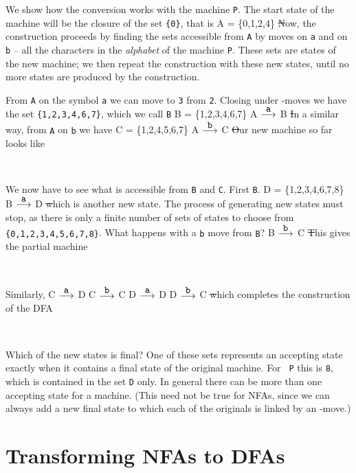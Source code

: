\documentclass[11pt]{article}
\begin{document}
We show how the conversion works with the machine {\tt P}. The start state of
the machine will be the closure of the set {\tt \{0\}}, that is 
\so
A = \{0,1,2,4\}
\st
Now, the construction proceeds by finding the sets accessible from {\tt A} by
moves on {\tt a} and on {\tt b} -- all the characters in the {\em alphabet\/}
of the machine {\tt P}. These sets are states of the new machine; we then
repeat the construction with these new states, until no more states are
produced by the construction.

From {\tt A} on the symbol {\tt a} we can move to {\tt 3} from {\tt 2}.
Closing  under \eps-moves we have the set {\tt \{1,2,3,4,6,7\}}, which we call
{\tt B}
\so
B = \{1,2,3,4,6,7\}
A $\stackrel{\mbox{\tt a}}{\longrightarrow}$ B
\st
In a similar way, from {\tt A} on {\tt b} we have 
\so
C = \{1,2,4,5,6,7\}
A $\stackrel{\mbox{\tt b}}{\longrightarrow}$ C
\st
Our new machine so far looks like       

\noindent
\begin{center}\  \end{center}

We now have to see what is accessible from {\tt B} and {\tt C}. First {\tt B}.
\so
D = \{1,2,3,4,6,7,8\}
B $\stackrel{\mbox{\tt a}}{\longrightarrow}$ D
\st
which is another new state. The process of generating new states must stop, as
there is only a finite number of sets of states to choose from
{\tt \{0,1,2,3,4,5,6,7,8\}}. What happens with a {\tt b} move from {\tt B}?
\so
B $\stackrel{\mbox{\tt b}}{\longrightarrow}$ C
\st
This gives the partial machine
\noindent
\begin{center}\  \end{center}
Similarly,
\so
C $\stackrel{\mbox{\tt a}}{\longrightarrow}$ D
C $\stackrel{\mbox{\tt b}}{\longrightarrow}$ C
D $\stackrel{\mbox{\tt a}}{\longrightarrow}$ D
D $\stackrel{\mbox{\tt b}}{\longrightarrow}$ C
\st
which completes the construction of the DFA
\noindent
\begin{center}\  \end{center}
Which of the new states is final? One of these sets represents an accepting
state exactly when it contains a final state of the original machine. For {\tt
P} this is {\tt 8}, which is contained in the set {\tt D} only. In general
there can be more than one accepting state for a machine. (This need not be
true for NFAs, since we can always add a new final state to which each of the
originals is linked by an \eps-move.)

\section{Transforming NFAs to DFAs}
\end{document}
